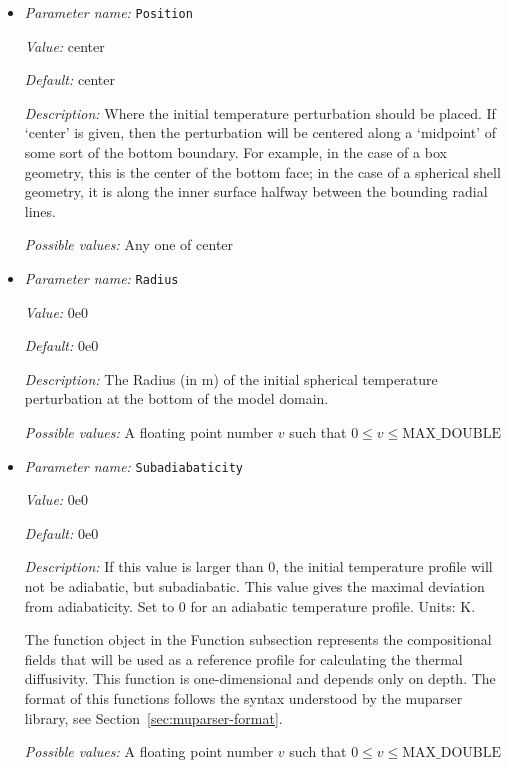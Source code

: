 \begin{itemize}
{\it Possible values:} A floating point number $v$ such that $0 \leq v \leq \text{MAX\_DOUBLE}$
\item {\it Parameter name:} {\tt Position}
\label{parameters:Initial temperature model/Adiabatic/Position}


{\it Value:} center


{\it Default:} center


{\it Description:} Where the initial temperature perturbation should be placed. If `center' is given, then the perturbation will be centered along a `midpoint' of some sort of the bottom boundary. For example, in the case of a box geometry, this is the center of the bottom face; in the case of a spherical shell geometry, it is along the inner surface halfway between the bounding radial lines.


{\it Possible values:} Any one of center
\item {\it Parameter name:} {\tt Radius}
\label{parameters:Initial temperature model/Adiabatic/Radius}


{\it Value:} 0e0


{\it Default:} 0e0


{\it Description:} The Radius (in m) of the initial spherical temperature perturbation at the bottom of the model domain.


{\it Possible values:} A floating point number $v$ such that $0 \leq v \leq \text{MAX\_DOUBLE}$
\item {\it Parameter name:} {\tt Subadiabaticity}
\label{parameters:Initial temperature model/Adiabatic/Subadiabaticity}


{\it Value:} 0e0


{\it Default:} 0e0


{\it Description:} If this value is larger than 0, the initial temperature profile will not be adiabatic, but subadiabatic. This value gives the maximal deviation from adiabaticity. Set to 0 for an adiabatic temperature profile. Units: K.

The function object in the Function subsection represents the compositional fields that will be used as a reference profile for calculating the thermal diffusivity. This function is one-dimensional and depends only on depth. The format of this functions follows the syntax understood by the muparser library, see Section~\ref{sec:muparser-format}.


{\it Possible values:} A floating point number $v$ such that $0 \leq v \leq \text{MAX\_DOUBLE}$
\end{itemize}



